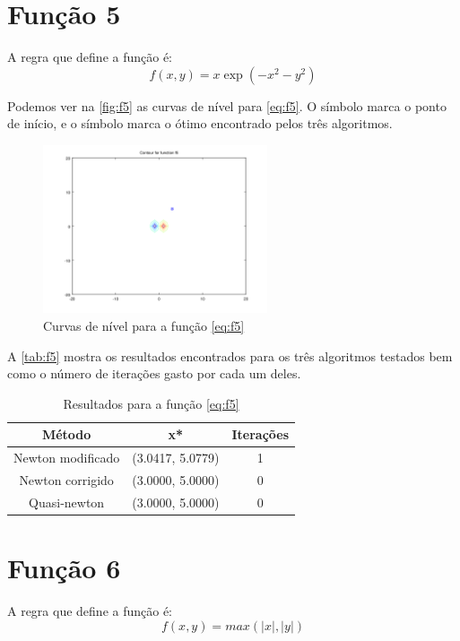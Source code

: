 \documentclass[12pt]{article}
\begin{document}
\section{Função 5}
A regra que define a função é:
\begin{equation}
\label{eq:f5}
f(x, y) = x\exp(-x^2 -y^2)
\end{equation}

Podemos ver na \autoref{fig:f5} as curvas de nível para \autoref{eq:f5}. O símbolo \textit{\textopenbullet} marca o ponto de início,
e o símbolo \textit{\texttimes} marca o ótimo encontrado pelos três algoritmos.

\begin{figure}[H]
  \centering
  \includegraphics[width=250px]{../matlab/images/f5_contour}
  \caption{Curvas de nível para a função \autoref{eq:f5}}
  \label{fig:f5}
\end{figure}

A \autoref{tab:f5} mostra os resultados encontrados para os três algoritmos testados bem como o número de iterações gasto por cada um deles.

\begin{table}[H]
\centering
\begin{tabular}{*3c}
\toprule
Método			&	x*		&	Iterações\\
\midrule
Newton modificado	&	(3.0417, 5.0779)	&	1\\
Newton corrigido	&	(3.0000, 5.0000)	&	0\\
Quasi-newton		&	(3.0000, 5.0000)	&	0\\
\bottomrule
\end{tabular}
\caption{\small{Resultados para a função \autoref{eq:f5} }}
\label{tab:f5}
\end{table}


\section{Função 6}
A regra que define a função é:
\begin{equation}
\label{eq:f6}
f(x, y) = max(|x|, |y|)
\end{equation}
\end{document}
